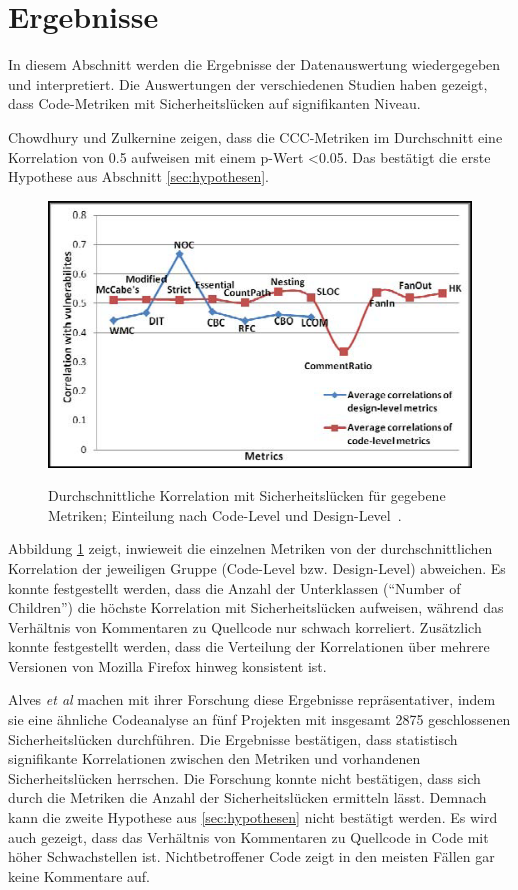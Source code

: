 \section{Ergebnisse}
\label{sec:ergebnisse}
In diesem Abschnitt werden die Ergebnisse der Datenauswertung wiedergegeben und interpretiert.
Die Auswertungen der verschiedenen Studien haben gezeigt, dass Code-Metriken mit Sicherheitslücken auf signifikanten Niveau\cite{chowdhury_zulkernine_2010,chowdhury_zulkernine_2009,alves_et_al}.

Chowdhury und Zulkernine \cite{chowdhury_zulkernine_2010} zeigen, dass die CCC-Metriken im Durchschnitt eine Korrelation von 0.5 aufweisen mit einem p-Wert \textless 0.05.
Das bestätigt die erste Hypothese aus Abschnitt \ref{sec:hypothesen}.
\begin{figure}
	\includegraphics[width=\textwidth]{img/code_vs_design.png}
	\label{fig:code_vs_design}
	\caption{Durchschnittliche Korrelation mit Sicherheitslücken für gegebene Metriken; Einteilung nach Code-Level und Design-Level~\cite{chowdhury_zulkernine_2010}.}
\end{figure}
Abbildung \ref{fig:code_vs_design} zeigt, inwieweit die einzelnen Metriken von der durchschnittlichen Korrelation der jeweiligen Gruppe (Code-Level bzw. Design-Level) abweichen.
Es konnte festgestellt werden, dass die Anzahl der Unterklassen ("`Number of Children"') die höchste Korrelation mit Sicherheitslücken aufweisen, während das Verhältnis von Kommentaren zu Quellcode nur schwach korreliert.
Zusätzlich konnte festgestellt werden, dass die Verteilung der Korrelationen über mehrere Versionen von Mozilla Firefox hinweg konsistent ist.

Alves \emph{et al} \cite{alves_et_al} machen mit ihrer Forschung diese Ergebnisse repräsentativer, indem sie eine ähnliche Codeanalyse an fünf Projekten mit insgesamt 2875 geschlossenen Sicherheitslücken durchführen.
Die Ergebnisse bestätigen, dass statistisch signifikante Korrelationen zwischen den Metriken und vorhandenen Sicherheitslücken herrschen.
Die Forschung konnte nicht bestätigen, dass sich durch die Metriken die Anzahl der Sicherheitslücken ermitteln lässt.
Demnach kann die zweite Hypothese aus \ref{sec:hypothesen} nicht bestätigt werden.
Es wird auch gezeigt, dass das Verhältnis von Kommentaren zu Quellcode in Code mit höher Schwachstellen ist.
Nichtbetroffener Code zeigt in den meisten Fällen gar keine Kommentare auf.

